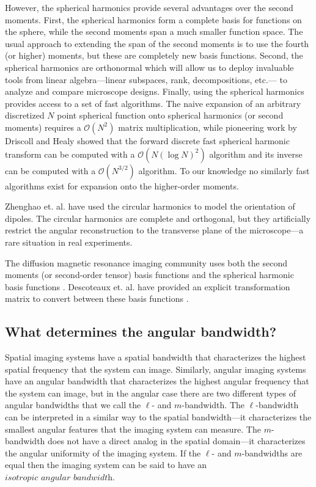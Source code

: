 \documentclass[]{osa-article}
\providecommand{\mc}[1]{\mathcal{#1}}
\begin{document}
However, the spherical harmonics provide several advantages over the second
moments. First, the spherical harmonics form a complete basis for functions on
the sphere, while the second moments span a much smaller function space. The
usual approach to extending the span of the second moments is to use the fourth
(or higher) moments, but these are completely new basis functions. Second, the
spherical harmonics are orthonormal which will allow us to deploy invaluable
tools from linear algebra---linear subspaces, rank, decompositions, etc.--- to
analyze and compare microscope designs. Finally, using the spherical harmonics
provides access to a set of fast algorithms. The naive expansion of an arbitrary
discretized $N$ point spherical function onto spherical harmonics (or second
moments) requires a $\mc{O}(N^2)$ matrix multiplication, while pioneering work
by Driscoll and Healy \cite{driscoll1994} showed that the forward discrete fast
spherical harmonic transform can be computed with a $\mc{O}(N(\log N)^2)$
algorithm and its inverse can be computed with a $\mc{O}(N^{3/2})$ algorithm. To
our knowledge no similarly fast algorithms exist for expansion onto the
higher-order moments.

Zhenghao et. al. \cite{zhanghao2017} have used the circular harmonics to model
the orientation of dipoles. The circular harmonics are complete and orthogonal,
but they artificially restrict the angular reconstruction to the transverse
plane of the microscope---a rare situation in real experiments.

The diffusion magnetic resonance imaging community uses both the second moments
(or second-order tensor) basis functions \cite{basser1994} and the spherical
harmonic basis functions \cite{tournier2004}. Descoteaux et. al. have provided
an explicit transformation matrix to convert between these basis functions
\cite{descoteaux2006}.


\subsection{What determines the angular bandwidth?}
Spatial imaging systems have a spatial bandwidth that characterizes the highest
spatial frequency that the system can image. Similarly, angular imaging systems
have an angular bandwidth that characterizes the highest angular frequency that
the system can image, but in the angular case there are two different types of
angular bandwidths that we call the $\ell$- and $m$-bandwidth. The $\ell$-bandwidth
can be interpreted in a similar way to the spatial bandwidth---it characterizes
the smallest angular features that the imaging system can measure. The
$m$-bandwidth does not have a direct analog in the spatial domain---it
characterizes the angular uniformity of the imaging system. If the $\ell$- and
$m$-bandwidths are equal then the imaging system can be said to have an 
$\textit{isotropic angular bandwidth}$.
\end{document}
